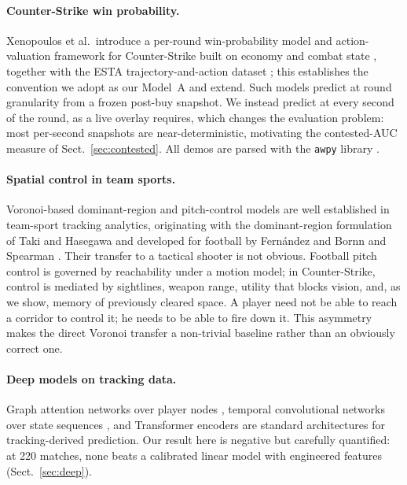 \documentclass[11pt,a4paper]{article}
\begin{document}
\paragraph{Counter-Strike win probability.}
Xenopoulos et al.\ introduce a per-round win-probability model and action-valuation
framework for Counter-Strike built on economy and combat state
\cite{xenopoulos2020valuing}, together with the ESTA trajectory-and-action dataset
\cite{xenopoulos2022esta}; this establishes the convention we adopt as our Model~A and
extend. Such models predict at round granularity from a frozen post-buy snapshot. We
instead predict at every second of the round, as a live overlay requires, which changes
the evaluation problem: most per-second snapshots are near-deterministic, motivating the
contested-AUC measure of Sect.~\ref{sec:contested}. All demos are parsed with the
\texttt{awpy} library \cite{awpy}.

\paragraph{Spatial control in team sports.}
Voronoi-based dominant-region and pitch-control models are well established in team-sport
tracking analytics, originating with the dominant-region formulation of Taki and Hasegawa
\cite{taki2000quantitative} and developed for football by Fern\'andez and Bornn
\cite{fernandez2018wide} and Spearman \cite{spearman2018pitchcontrol}. Their transfer to a
tactical shooter is not obvious. Football pitch control is governed by reachability under a
motion model; in Counter-Strike, control is mediated by sightlines, weapon range, utility
that blocks vision, and, as we show, memory of previously cleared space. A player need not
be able to reach a corridor to control it; he needs to be able to fire down it. This
asymmetry makes the direct Voronoi transfer a non-trivial baseline rather than an obviously
correct one.

\paragraph{Deep models on tracking data.}
Graph attention networks over player nodes \cite{velickovic2018gat}, temporal convolutional
networks over state sequences \cite{bai2018tcn}, and Transformer encoders
\cite{vaswani2017attention} are standard architectures for tracking-derived prediction. Our
result here is negative but carefully quantified: at 220 matches, none beats a calibrated
linear model with engineered features (Sect.~\ref{sec:deep}).
\end{document}
